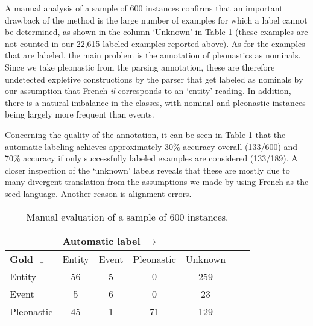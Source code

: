 \documentclass[10pt, a4paper]{article}
\begin{document}
A manual analysis of a sample of 600 instances confirms that an important drawback of  
the method is the large number of examples for which a label cannot be determined, 
as shown in the column `Unknown' in Table \ref{tab:manualsample600} (these examples are not counted in our 22,615 labeled examples reported above). 
As for the examples that are labeled, the main 
problem is the annotation of pleonastics as nominals. Since we take pleonastic 
from the parsing annotation, these are therefore undetected expletive constructions by the parser that get labeled as nominals by our assumption that French \textit{il} corresponds to an `entity' reading. In addition, 
there is a natural imbalance in the classes, with 
nominal and pleonastic instances being largely more frequent than events.  

Concerning the quality of the annotation, it can
be seen in Table \ref{tab:manualsample600} that the automatic labeling achieves 
approximately 30\% accuracy overall (133/600) and 70\% accuracy if only successfully labeled  
examples are considered (133/189). A closer 
inspection of the `unknown' labels reveals that these are mostly due to many 
divergent translation from the assumptions we made by using French as the seed 
language. Another reason is alignment errors. 


\begin{table}[h!]\centering 
\begin{tabular}{p{1.3cm}|cccccc} 
&\multicolumn{4}{l}{\textbf{Automatic label $\rightarrow$}}\\
\toprule 
{\textbf{Gold $\downarrow$}}&Entity & Event &Pleonastic & Unknown \\ 
\midrule Entity &   56  &  5   &   0     &  259  \\ 
Event &    5  &  6   &  0  &  23\\ 
Pleonastic& 45 & 1&  71&  129\\
\bottomrule 
\end{tabular} \caption{Manual evaluation of a sample of 600
instances.}\label{tab:manualsample600} 
\end{table}

%
%
%
%
\end{document}
